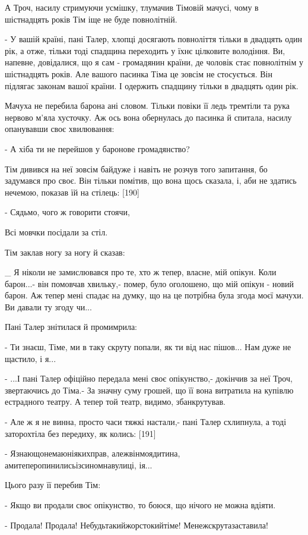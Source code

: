 А Троч, насилу стримуючи усмішку, тлумачив Тімовій мачусі, чому в шістнадцять років Тім іще не буде повнолітній.

- У вашій країні, пані Талер, хлопці досягають повноліття тільки в двадцять один рік, а отже, тільки тоді спадщина переходить у їхнє цілковите володіння. Ви, напевне, довідалися, що я сам - громадянин країни, де чоловік стає повнолітнім у шістнадцять років. Але вашого пасинка Тіма це зовсім не стосується. Він підлягає законам вашої країни. І одержить спадщину тільки в двадцять один рік.

Мачуха не перебила барона ані словом. Тільки повіки її ледь тремтіли та рука нервово м'яла хусточку. Аж ось вона обернулась до пасинка й спитала, насилу опанувавши своє хвилювання:

- А хіба ти не перейшов у баронове громадянство?

Тім дивився на неї зовсім байдуже і навіть не розчув того запитання, бо задумався про своє. Він тільки помітив, що вона щось сказала, і, аби не здатись нечемою, показав їй на стілець: [190]

- Сядьмо, чого ж говорити стоячи,

Всі мовчки посідали за стіл.

Тім заклав ногу за ногу й сказав:

_ Я ніколи не замислювався про те, хто ж тепер, власне, мій опікун. Коли барон...- він помовчав хвильку,- помер, було оголошено, що мій опікун - новий барон. Аж тепер мені спадає на думку, що на це потрібна була згода моєї мачухи. Ви давали ту згоду чи...

Пані Талер знітилася й промимрила:

- Ти знаєш, Тіме, ми в таку скруту попали, як ти від нас пішов... Нам дуже не щастило, і я...

- ...І пані Талер офіційно передала мені своє опікунство,- докінчив за неї Троч, звертаючись до Тіма.- За значну суму грошей, що її вона витратила на купівлю естрадного театру. А тепер той театр, видимо, збанкрутував.

- Але ж я не винна, просто часи тяжкі настали,- пані Талер схлипнула, а тоді заторохтіла без передиху, як колись: [191]

- Язнающонемаюніякихправ, алежвінмоядитина, амитеперопинилисьізсиномнавулиці, ія...

Цього разу її перебив Тім:

- Якщо ви продали своє опікунство, то боюся, що нічого не можна вдіяти.

- Продала! Продала! Небудьтакийжорстокийтіме! Менежскрутазаставила!

